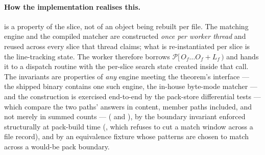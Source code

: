 \documentclass[11pt,letterpaper]{article}
\begin{document}
\paragraph{How the implementation realises this.}
 is a property of the slice, not of an object being
rebuilt per file. The matching engine and the compiled matcher are
constructed \emph{once per worker thread} and reused across every slice that
thread claims; what is re-instantiated per slice is the line-tracking state.
The worker therefore borrows $\mathcal{P}[\,O_f\dots O_f+L_f\,)$ and hands
it to a dispatch routine with the per-slice search state created inside that
call. The invariants are properties of \emph{any} engine meeting the
theorem's interface --- the shipped binary contains one such engine, the
in-house byte-mode matcher --- and the construction is exercised
end-to-end by the pack-store differential tests --- which compare the two
paths' answers in content, member paths included, and not merely in summed
counts ---
( and
),
by the boundary invariant enforced structurally at pack-build time
(, which refuses to cut a
match window across a file record), and by an equivalence fixture whose
patterns are chosen to match across a would-be pack boundary.
\end{document}
